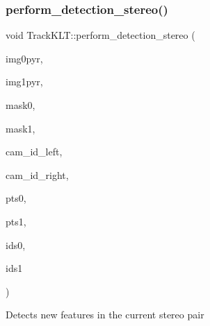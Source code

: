 \subsubsection{\texorpdfstring{perform\+\_\+detection\+\_\+stereo()}{perform\_detection\_stereo()}}
{\footnotesize\ttfamily void Track\+K\+L\+T\+::perform\+\_\+detection\+\_\+stereo (\begin{DoxyParamCaption}\item[{const std\+::vector$<$ cv\+::\+Mat $>$ \&}]{img0pyr,  }\item[{const std\+::vector$<$ cv\+::\+Mat $>$ \&}]{img1pyr,  }\item[{const cv\+::\+Mat \&}]{mask0,  }\item[{const cv\+::\+Mat \&}]{mask1,  }\item[{size\+\_\+t}]{cam\+\_\+id\+\_\+left,  }\item[{size\+\_\+t}]{cam\+\_\+id\+\_\+right,  }\item[{std\+::vector$<$ cv\+::\+Key\+Point $>$ \&}]{pts0,  }\item[{std\+::vector$<$ cv\+::\+Key\+Point $>$ \&}]{pts1,  }\item[{std\+::vector$<$ size\+\_\+t $>$ \&}]{ids0,  }\item[{std\+::vector$<$ size\+\_\+t $>$ \&}]{ids1 }\end{DoxyParamCaption})\hspace{0.3cm}{\ttfamily [protected]}}



Detects new features in the current stereo pair 


